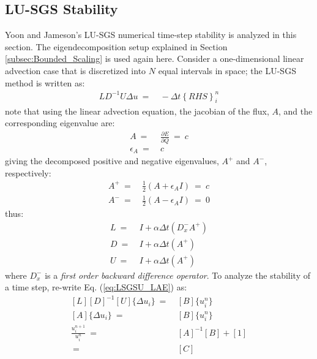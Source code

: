 \documentclass[conf]{new-aiaa}
\begin{document}
\subsection{LU-SGS Stability}
\label{subsec:LUSGS}
Yoon and Jameson's LU-SGS numerical time-step stability is analyzed in this section. The eigendecomposition setup explained in Section \ref{subsec:Bounded_Scaling} is used again here.
Consider a one-dimensional linear advection case that is discretized into $N$ equal intervals in space; the LU-SGS method is written as:
\begin{equation}
	\begin{split}
	\label{eq:LSGSU_LAE}
		LD^{-1}U\Delta{u}~=&~-\Delta{t}\left\{RHS\right\}^{n}_i
	\end{split}
\end{equation}
note that using the linear advection equation, the jacobian of the flux, $A$, and the corresponding eigenvalue are:
\begin{equation}
	\begin{split}
		\label{eq:FluxJac_Eig}
  			A~=&~\frac{\partial{E}}{\partial{Q}}~=~c \\
  			\epsilon_A~=&~c
	\end{split}
\end{equation}
giving the decomposed positive and negative eigenvalues, $A^+$ and $A^-$, respectively:
\begin{equation}
	\begin{split}
		\label{eq:A_Plus_Minus}
  			A^{+}~=&~\frac{1}{2}\left(A+\epsilon_AI\right)~=~c \\
  			A^{-}~=&~\frac{1}{2}\left(A-\epsilon_AI\right)~=~0
	\end{split}
\end{equation}
thus:
\begin{equation}
	\label{eq:LDU}
	\begin{split}
            L~=&~I + \alpha\Delta{t}\left(D_x^-A^+\right)\\
		D~=&~I + \alpha\Delta{t}\left(A^+\right) \\
		U~=&~I + \alpha\Delta{t}\left(A^+\right)
	\end{split}
\end{equation}
where $D_x^-$ is a \textit{first order backward difference operator}.  
To analyze the stability of a time step, re-write Eq. (\ref{eq:LSGSU_LAE}) as:
\begin{equation}
\label{eq:AB}
	\begin{split}
  		[L][D]^{-1}[U]\{\Delta{u_i\}}~=&~[B]\{u_i^{n}\} \\
  		[A]\{\Delta{u_i\}}~=&~[B]\{u_i^{n}\} \\
  		\frac{u_i^{n+1}}{u_i^{n}}~=&~[A]^{-1}[B] + [1] \\
  		~=&~[C]
	\end{split}
\end{equation}
\end{document}
